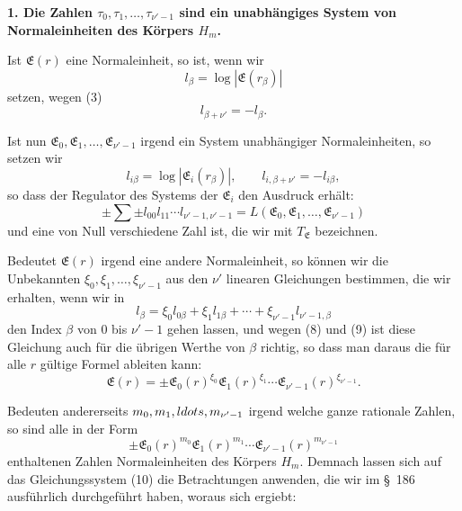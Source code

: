 \documentclass[11pt]{article}
\begin{document}
\begin{center}\textbf{1. Die Zahlen $\tau_0,\tau_1,\ldots,\tau_{\nu'-1}$ sind ein unabhängiges System von Normaleinheiten des Körpers $H_m$.}\end{center}

Ist $\mathfrak E(r)$ eine Normaleinheit, so ist, wenn wir
\begin{equation}
l_\beta=\log|\mathfrak E(r_\beta)|
\tag{7}
\end{equation}
setzen, wegen (3)
\begin{equation}
l_{\beta+\nu'}=-l_\beta.
\tag{8}
\end{equation}

Ist nun $\mathfrak E_0,\mathfrak E_1,\ldots,\mathfrak E_{\nu'-1}$ irgend ein System unabhängiger Normaleinheiten, so setzen wir
\begin{equation}
l_{i\beta}=\log|\mathfrak E_i(r_\beta)|,\qquad l_{i,\beta+\nu'}=-l_{i\beta},
\tag{9}
\end{equation}
so dass der Regulator des Systems der $\mathfrak E_i$ den Ausdruck erhält:
\begin{equation}
\pm\sum\pm l_{00}l_{11}\cdots l_{\nu'-1,\nu'-1}=L(\mathfrak E_0,\mathfrak E_1,\ldots,\mathfrak E_{\nu'-1})
\tag{10}
\end{equation}
und eine von Null verschiedene Zahl ist, die wir mit $T_\mathfrak E$ bezeichnen.

Bedeutet $\mathfrak E(r)$ irgend eine andere Normaleinheit, so können wir die Unbekannten $\xi_0,\xi_1,\ldots,\xi_{\nu'-1}$ aus den $\nu'$ linearen Gleichungen bestimmen, die wir erhalten, wenn wir in
\begin{equation}
l_\beta=\xi_0l_{0\beta}+\xi_1l_{1\beta}+\cdots+\xi_{\nu'-1}l_{\nu'-1,\beta}
\tag{11}
\end{equation}
den Index $\beta$ von $0$ bis $\nu'-1$ gehen lassen, und wegen (8) und (9) ist diese Gleichung auch für die übrigen Werthe von $\beta$ richtig, so dass man daraus die für alle $r$ gültige Formel ableiten kann:
\begin{equation}
\mathfrak E(r)=\pm\mathfrak E_0(r)^{\xi_0}\mathfrak E_1(r)^{\xi_1}\cdots\mathfrak E_{\nu'-1}(r)^{\xi_{\nu'-1}}.
\tag{12}
\end{equation}

Bedeuten andererseits $m_0,m_1,\\ldots,m_{\nu'-1}$ irgend welche ganze rationale Zahlen, so sind alle in der Form
\[
\pm\mathfrak E_0(r)^{m_0}\mathfrak E_1(r)^{m_1}\cdots\mathfrak E_{\nu'-1}(r)^{m_{\nu'-1}}
\]
enthaltenen Zahlen Normaleinheiten des Körpers $H_m$. Demnach lassen sich auf das Gleichungssystem (10) die Betrachtungen anwenden, die wir im \S~186 ausführlich durchgeführt haben, woraus sich ergiebt:
\end{document}
